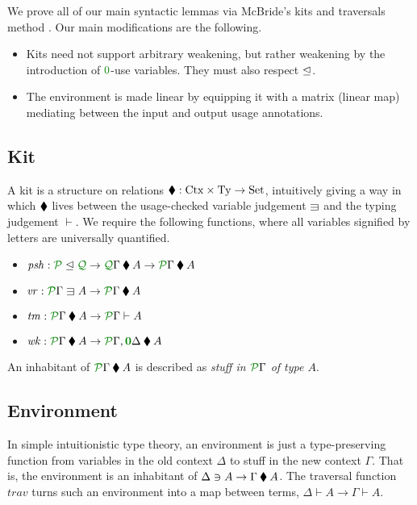 \documentclass[submission,copyright,creativecommons]{eptcs}
\begin{document}
We prove all of our main syntactic lemmas via McBride's kits and traversals
method \cite{rensub05}.
Our main modifications are the following.
\begin{itemize}
  \item Kits need not support arbitrary weakening, but rather weakening by the
    introduction of $\rescomment 0$-use variables.
    They must also respect $\trianglelefteq$.
  \item The environment is made linear by equipping it with a matrix (linear
    map) mediating between the input and output usage annotations.
\end{itemize}

\subsection{Kit}

A kit is a structure on relations
$\mathbin{\blacklozenge} : \mathrm{Ctx} \times \mathrm{Ty} \to \mathrm{Set}$, intuitively
giving a way in which $\mathbin{\blacklozenge}$ lives between the usage-checked variable
judgement $\lvar$ and the typing judgement $\vdash$.
We require the following functions, where all variables signified by letters are
universally quantified.

\begin{itemize}
  \item
    $\mathit{psh} : \resctx P \subres \resctx Q \to
    \ctx{\Gamma}{Q} \kitrel A \to \ctx{\Gamma}{P} \kitrel A$
  \item $\mathit{vr} : \ctx{\Gamma}{P} \lvar A \to
    \ctx{\Gamma}{P} \kitrel A$
  \item $\mathit{tm} : \ctx{\Gamma}{P} \kitrel A \to
    \ctx{\Gamma}{P} \vdash A$
  \item $\mathit{wk} : \ctx{\Gamma}{P} \kitrel A \to
    \ctx{\Gamma}{P}, \ctx{\Delta}{\vct 0} \kitrel A$
\end{itemize}

An inhabitant of $\ctx{\Gamma}{P} \kitrel A$ is described as
\emph{stuff in $\ctx{\Gamma}{P}$ of type $A$}.

\subsection{Environment}

In simple intuitionistic type theory, an environment is just a type-preserving
function from variables in the old context $\Delta$ to stuff in the new context
$\Gamma$.
That is, the environment is an inhabitant of
$\Delta \ni A \to \Gamma \mathbin{\blacklozenge} A$.
The traversal function $\mathit{trav}$ turns such an environment into a map
between terms, $\Delta \vdash A \to \Gamma \vdash A$.
\end{document}
